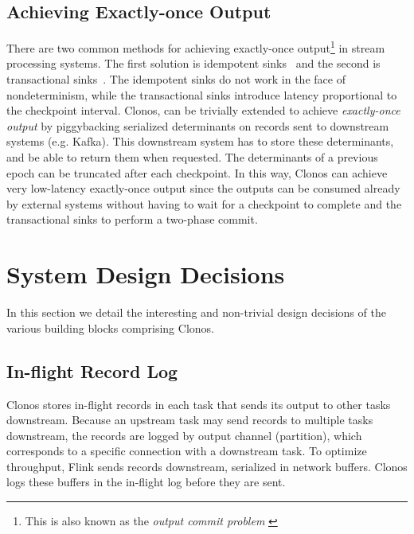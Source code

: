 \documentclass[sigconf]{acmart}
\begin{document}
\subsection{Achieving Exactly-once Output}
\label{sec:exactly-once-output}
There are two common methods for achieving exactly-once output\footnote{This is also known as the \textit{output commit problem} \cite{elnozahy2002survey}} in stream processing systems. The first solution is idempotent sinks~\cite{ArmbrustDT18,CUSTOM:web/Storm,CUSTOM:web/Trident} and the second is transactional sinks~\cite{ArmbrustDT18, CarboneEF17}.
The idempotent sinks do not work in the face of nondeterminism, while the transactional sinks introduce latency proportional to the checkpoint interval.
Clonos, can be trivially extended to achieve \textit{exactly-once output} by piggybacking serialized determinants on records sent to downstream systems (e.g. Kafka).
This downstream system has to store these determinants, and be able to return them when requested. The determinants of a previous epoch can be truncated after each checkpoint. 
In this way, Clonos can achieve very low-latency exactly-once output since the outputs can be consumed already by external systems without having to wait for a checkpoint to complete and the transactional sinks to perform a two-phase commit.








\section{System Design Decisions}
\label{sec:design}

In this section we detail the interesting and non-trivial design decisions of the various building blocks comprising Clonos.

\subsection{In-flight Record Log}
\label{sec:in-flight-design}

Clonos stores in-flight records in each task that sends its output to other tasks downstream.
Because an upstream task may send records to multiple tasks downstream, the records are logged by output channel (partition), which corresponds to a specific connection with a downstream task. 
To optimize throughput, Flink sends records downstream, serialized in network buffers. Clonos logs these buffers in the in-flight log before they are sent.
\end{document}
